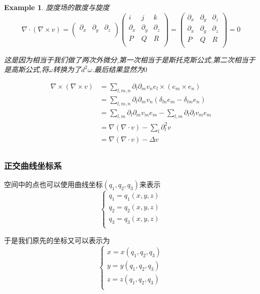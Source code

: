 \documentclass[11pt,hyperref,a4paper,UTF8]{ctexart}
\newtheorem{example}{Example}[subsection]
\begin{document}
\begin{CJK}{UTF8}{gkai}
\begin{example}
  旋度场的散度与旋度
  \[\nabla \cdot (\nabla \times v) = \begin{pmatrix}
    \partial_x & \partial_y & \partial_z\\
  \end{pmatrix}\begin{pmatrix}
    i & j & k\\
    \partial_x & \partial_y & \partial_z\\
    P & Q & R\\    
  \end{pmatrix} =  \begin{pmatrix}
    \partial_x & \partial_y & \partial_z\\
    \partial_x & \partial_y & \partial_z\\
    P & Q & R\\    
  \end{pmatrix} = 0\]

  这是因为相当于我们做了两次外微分,第一次相当于是斯托克斯公式,第二次相当于是高斯公式,将$\omega$转换为了$d^2 \omega$.最后结果显然为$0$

  \[
  \begin{aligned}  
  \nabla \times (\nabla \times v) &= \sum_{l,m,n} \partial_{l} \partial_{m} v_n e_l \times (e_m \times e_n)\\
  &= \sum_{l,m,n} \partial_{l} \partial_{m} v_n(\delta_{ln} e_m - \delta_{lm} e_n)\\
  &= \sum_{l,m} \partial_{l}\partial_{m} v_m e_m - \sum_{l,m} \partial_{l} \partial_{l} v_m e_m\\
  &= \nabla (\nabla \cdot v) - \sum_{l} \partial^2_l v\\
  &= \nabla (\nabla \cdot v) - \Delta v\\
  \end{aligned}
  \]

\end{example}
\subsubsection{正交曲线坐标系}
空间中的点也可以使用曲线坐标$(q_1,q_2,q_3)$来表示
\[\begin{cases}
  q_1 = q_1(x,y,z)\\
  q_2 = q_2(x,y,z)\\
  q_3 = q_3(x,y,z)\\
\end{cases}\]

于是我们原先的坐标又可以表示为
\[\begin{cases}
  x = x(q_1,q_2,q_3)\\
  y = y(q_1,q_2,q_3)\\
  z = z(q_1,q_2,q_3)\\
\end{cases}\]


\end{CJK}
\end{document}
